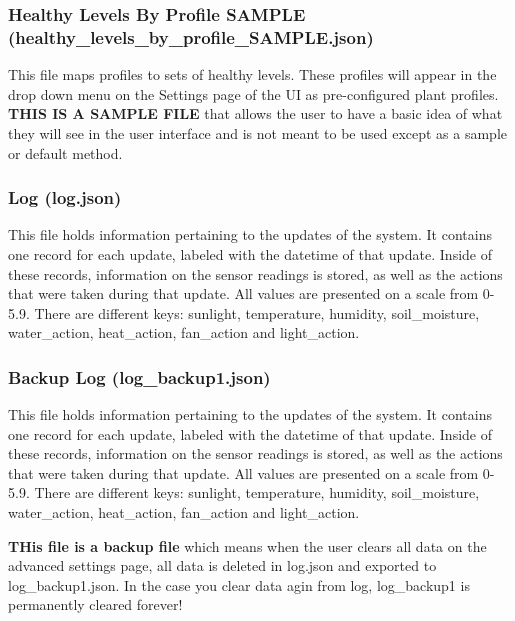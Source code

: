 \documentclass[
]{article}
\begin{document}
\hypertarget{healthy-levels-by-profile-sample-healthy_levels_by_profile_sample.json}{%
\subsubsection{Healthy Levels By Profile SAMPLE
(healthy\_levels\_by\_profile\_SAMPLE.json)}\label{healthy-levels-by-profile-sample-healthy_levels_by_profile_sample.json}}

This file maps profiles to sets of healthy levels. These profiles will
appear in the drop down menu on the Settings page of the UI as
pre-configured plant profiles. \textbf{THIS IS A SAMPLE FILE} that
allows the user to have a basic idea of what they will see in the user
interface and is not meant to be used except as a sample or default
method.

\hypertarget{log-log.json}{%
\subsubsection{Log (log.json)}\label{log-log.json}}

This file holds information pertaining to the updates of the system. It
contains one record for each update, labeled with the datetime of that
update. Inside of these records, information on the sensor readings is
stored, as well as the actions that were taken during that update. All
values are presented on a scale from 0-5.9. There are different keys:
sunlight, temperature, humidity, soil\_moisture, water\_action,
heat\_action, fan\_action and light\_action.

\hypertarget{backup-log-log_backup1.json}{%
\subsubsection{Backup Log
(log\_backup1.json)}\label{backup-log-log_backup1.json}}

This file holds information pertaining to the updates of the system. It
contains one record for each update, labeled with the datetime of that
update. Inside of these records, information on the sensor readings is
stored, as well as the actions that were taken during that update. All
values are presented on a scale from 0-5.9. There are different keys:
sunlight, temperature, humidity, soil\_moisture, water\_action,
heat\_action, fan\_action and light\_action.

\textbf{THis file is a backup file} which means when the user clears all
data on the advanced settings page, all data is deleted in log.json and
exported to log\_backup1.json. In the case you clear data agin from log,
log\_backup1 is permanently cleared forever!
\end{document}

